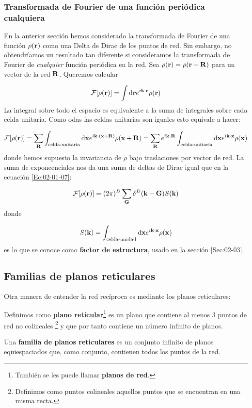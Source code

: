 \subsubsection{Transformada de Fourier de una función periódica cualquiera}

En la anterior sección hemos considerado la transformada de Fourier de una función $\rho(\mathbf{r})$ como una Delta de Dirac de los puntos de red. Sin embargo, no obtendríamos un resultado tan diferente si consideramos la transformada de Fourier de \textit{cualquier} función periódica en la red. Sea $\rho(\mathbf{r})=\rho(\mathbf{r}+\mathbf{R})$ para un vector de la red $\mathbf{R}$. Queremos calcular 

\begin{equation}
	\mathcal{F} [\rho(\mathbf{r})] = \int \mathrm{d} \mathbf{r} e^{i \mathbf{k} \cdot \mathbf{r}} \rho (\mathbf{r})
\end{equation}	
La integral sobre todo el espacio es equivalente a la suma de integrales sobre cada celda unitaria. Como odas las celdas unitarias son iguales esto equivale a hacer:

\begin{equation}
	\mathcal{F} [\rho(\mathbf{r})] = \sum_{\mathbf{R}}\int_{\text{celda-unitaria}} \mathrm{d} \mathbf{x} e^{i \mathbf{k} \cdot (\mathbf{x} + \mathbf{R})} \rho (\mathbf{x} + \mathbf{R})  = \sum_{\mathbf{R}} e^{i \mathbf{k} \cdot \mathbf{R}} \int_{\text{celda-unitaria}} \mathrm{d} \mathbf{x} e^{i \mathbf{k} \cdot \mathbf{x}} \rho (\mathbf{x})
\end{equation}
donde hemos supuesto la invariancia de $\rho$ bajo traslaciones por vector de red. La suma de exponeenciales nos da una suma de deltas de Dirac igual que en la ecuación  \ref{Ec:02-01-07}:

\begin{equation}
	\mathcal{F} [\rho(\mathbf{r})] = (2\pi)^D \sum_{\mathbf{G}} \delta^D (\mathbf{k} - \mathbf{G}) S(\mathbf{k})
\end{equation}
donde 

\begin{equation}
	S(\mathbf{k}) = \int_{\text{celda-unidad}} \mathrm{d} \mathbf{x} e^{i \mathbf{k} \cdot \mathbf{x}} \rho (\mathbf{x})
\end{equation}	
es lo que se conoce como \textbf{factor de estructura}, usado en la sección \ref{Sec:02-03}.

\subsection{Familias de planos reticulares}

Otra manera de entender la red recíproca es mediante los planos reticulares:

\begin{definition}  %
	Definimos como \textbf{plano reticular}\footnote{También se les puede llamar \textbf{planos de red}.} es un plano que contiene al menos 3 puntos de red no colineales \footnote{Definimos como puntos colineales aquellos puntos que se encuentran en una misma recta.} y que por tanto contiene un número infinito de planos.
\end{definition}
\begin{definition} %
	Una \textbf{familia de planos reticulares} es un conjunto infinito de planos equiespaciados que, como conjunto, contienen todos los puntos de la red.
\end{definition}

